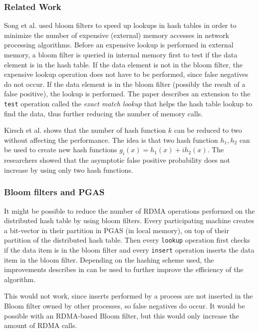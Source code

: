 \subsubsection{Related Work}
Song et al. \cite{song2005fast} used bloom filters to speed up lookups in hash tables in order to minimize the number of expensive (external) memory accesses in network processing algorithms. Before an expensive lookup is performed in external memory, a bloom filter is queried in internal memory first to test if the data element is in the hash table. If the data element is not in the bloom filter, the expensive lookup operation does not have to be performed, since false negatives do not occur. If the data element is in the bloom filter (possibly the result of a false positive), the lookup is performed. The paper describes an extension to the \texttt{test} operation called the \emph{exact match lookup} that helps the hash table lookup to find the data, thus further reducing the number of memory calls. 

Kirsch et al. \cite{kirsch2006less} shows that the number of hash function $k$ can be reduced to two without affecting the performance. The idea is that two hash function $h_1, h_2$ can be used to create new hash functions $g_i(x) = h_1(x) + ih_2(x)$. The researchers showed that the asymptotic false positive probability does not increase by using only two hash functions.

\subsubsection{Bloom filters and PGAS}
It might be possible to reduce the number of RDMA operations performed on the distributed hash table by using bloom filters. Every participating machine creates a bit-vector in their partition in PGAS (in local memory), on top of their partition of the distributed hash table. Then every \texttt{lookup} operation first checks if the data item is in the bloom filter and every \texttt{insert} operation inserts the data item in the bloom filter. Depending on the hashing scheme used, the improvements describes in \cite{song2005fast, kirsch2006less} can be used to further improve the efficiency of the algorithm.

This would not work, since inserts performed by a process are not inserted in the Bloom filter owned by other processes, so false negatives do occur. It would be possible with an RDMA-based Bloom filter, but this would only increase the amount of RDMA calls.

